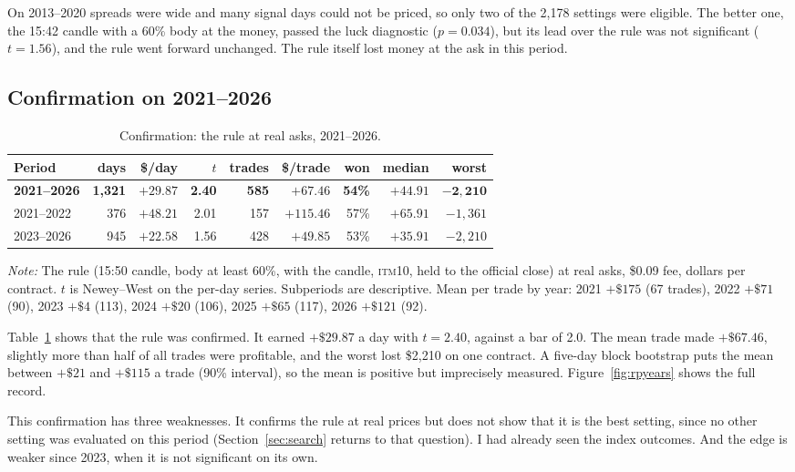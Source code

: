\documentclass[12pt,letterpaper]{article}
\newcommand{\tabnotes}[1]{\par\vspace{5pt}\parbox{\linewidth}{\footnotesize\setlength{\parindent}{0pt}\textit{Note:} #1}\par}
\newcommand{\ITM}[1]{\textsc{itm}#1}
\begin{document}
On 2013--2020 spreads were wide and many signal days could not be priced, so
only two of the 2{,}178 settings were eligible. The better one, the 15:42 candle
with a 60\% body at the money, passed the luck diagnostic ($p = 0.034$), but its
lead over the rule was not significant ($t = 1.56$), and the rule went forward
unchanged. The rule itself lost money at the ask in this period.

\subsection{Confirmation on 2021--2026}
\label{sec:confirm}

\begin{table}[htbp]
\centering
\caption{Confirmation: the rule at real asks, 2021--2026.}
\label{tab:rpconf}
\setlength{\tabcolsep}{4pt}
\begin{tabular}{lrrrrrrrr}
\toprule
Period & days & \$/day & $t$ & trades & \$/trade & won & median & worst \\
\midrule
\textbf{2021--2026} & \textbf{1{,}321} & $\mathbf{+29.87}$ & \textbf{2.40} & \textbf{585} & $\mathbf{+67.46}$ & \textbf{54\%} & $\mathbf{+44.91}$ & $\mathbf{-2{,}210}$ \\
2021--2022 & 376 & $+48.21$ & 2.01 & 157 & $+115.46$ & 57\% & $+65.91$ & $-1{,}361$ \\
2023--2026 & 945 & $+22.58$ & 1.56 & 428 & $+49.85$ & 53\% & $+35.91$ & $-2{,}210$ \\
\bottomrule
\end{tabular}
\tabnotes{The rule (15:50 candle, body at least 60\%, with the candle, \ITM{10},
held to the official close) at real asks, \$0.09 fee, dollars per contract. $t$
is Newey--West on the per-day series. Subperiods are descriptive. Mean per trade
by year: 2021 $+\$175$ (67 trades), 2022 $+\$71$ (90), 2023 $+\$4$ (113), 2024
$+\$20$ (106), 2025 $+\$65$ (117), 2026 $+\$121$ (92).}
\end{table}

Table~\ref{tab:rpconf} shows that the rule was confirmed. It earned $+\$29.87$ a
day with $t = 2.40$, against a bar of 2.0. The mean trade made $+\$67.46$,
slightly more than half of all trades were profitable, and the worst lost
\$2{,}210 on one contract. A five-day block bootstrap puts the mean between
$+\$21$ and $+\$115$ a trade (90\% interval), so the mean is positive but
imprecisely measured. Figure~\ref{fig:rpyears} shows the full record.

This confirmation has three weaknesses. It confirms the rule at real prices but
does not show that it is the best setting, since no other setting was evaluated
on this period (Section~\ref{sec:search} returns to that question). I had
already seen the index outcomes. And the edge is weaker since
2023, when it is not significant on its own.
\end{document}

